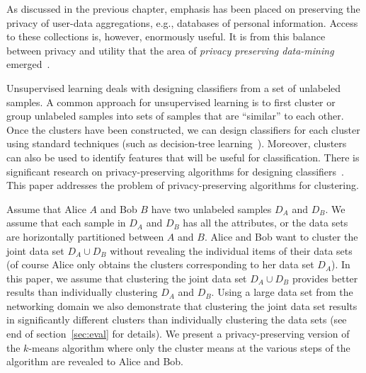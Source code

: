 As discussed in the previous chapter,
emphasis has been placed on preserving the
privacy of user-data aggregations, e.g., databases of personal
information.  Access to these  collections is, however, enormously
useful.  It is from this balance between privacy and utility that the
area of {\it privacy preserving data-mining}
emerged~\cite{Agrawal-Srikant,Lindell-Pinkas}.



Unsupervised learning deals with designing classifiers from a set of
unlabeled samples. A common approach for unsupervised learning is to
first cluster or group unlabeled samples into sets of samples that are
``similar'' to each other. Once the clusters have been constructed, we
can design classifiers for each cluster using standard techniques
(such as decision-tree
learning~\cite{Mitchell:AI,Quinlan:86}). Moreover, clusters can also
be used to identify features that will be useful for
classification. There is significant research on privacy-preserving
algorithms for designing
classifiers~\cite{Agrawal-Srikant,Lindell-Pinkas}. This paper
addresses the problem of privacy-preserving algorithms for clustering.



Assume that Alice $A$ and Bob $B$ have two unlabeled samples $D_A$ and
$D_B$. We assume that each sample in $D_A$ and $D_B$ has all the
attributes, or the data sets are horizontally partitioned between $A$
and $B$. Alice and Bob want to cluster the joint data set $D_A \cup
D_B$ without revealing the individual items of their data sets (of
course Alice only obtains the clusters corresponding to her data set
$D_A$). In this paper, we assume that clustering the joint data set
$D_A \cup D_B$ provides better results than individually clustering
$D_A$ and $D_B$.  Using a large data set from the networking domain we also demonstrate
that clustering the joint data set results in significantly different
clusters than individually clustering the data sets (see end of
section~\ref{sec:eval} for details). We present a privacy-preserving
version of the $k$-means algorithm where only the cluster means at the
various steps of the algorithm are revealed to Alice and Bob.



